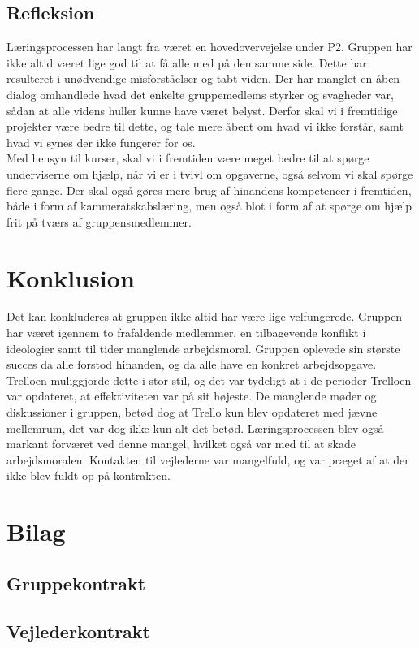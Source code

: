 \documentclass[11pt]{article}
\begin{document}
\subsection{Refleksion}
Læringsprocessen har langt fra været en hovedovervejelse under P2. Gruppen har ikke altid været lige god til at få alle med på den samme side. Dette har resulteret i unødvendige misforståelser og tabt viden. Der har manglet en åben dialog omhandlede hvad det enkelte gruppemedlems styrker og svagheder var, sådan at alle videns huller kunne have været belyst. Derfor skal vi i fremtidige projekter være bedre til dette, og tale mere åbent om hvad vi ikke forstår, samt hvad vi synes der ikke fungerer for os.\\
Med hensyn til kurser, skal vi i fremtiden være meget bedre til at spørge underviserne om hjælp, når vi er i tvivl om opgaverne, også selvom vi skal spørge flere gange. Der skal også gøres mere brug af hinandens kompetencer i fremtiden, både i form af kammeratskabslæring, men også blot i form af at spørge om hjælp frit på tværs af gruppensmedlemmer.

\section{Konklusion}
Det kan konkluderes at gruppen ikke altid har være lige velfungerede. Gruppen har været igennem to frafaldende medlemmer, en tilbagevende konflikt i ideologier samt til tider manglende arbejdsmoral. Gruppen oplevede sin største succes da alle forstod hinanden, og da alle have en konkret arbejdsopgave. Trelloen muliggjorde dette i stor stil, og det var tydeligt at i de perioder Trelloen var opdateret, at effektiviteten var på sit højeste. De manglende møder og diskussioner i gruppen, betød dog at Trello kun blev opdateret med jævne mellemrum, det var dog ikke kun alt det betød. Læringsprocessen blev også markant forværet ved denne mangel, hvilket også var med til at skade arbejdsmoralen. Kontakten til vejlederne var mangelfuld, og var præget af at der ikke blev fuldt op på kontrakten.

\newpage
\section{Bilag}
\subsection{Gruppekontrakt}
\label{gruppekontrakt}
\begin{mdframed}[linewidth=0pt,backgroundcolor=lightgray!20,innertopmargin = 0.4cm,innerbottommargin = 0.4cm]
    
\end{mdframed}

\subsection{Vejlederkontrakt}
\label{vejlederkontrakt}
\begin{mdframed}[linewidth=0pt,backgroundcolor=lightgray!20,innertopmargin = 0.4cm,innerbottommargin = 0.4cm]
    
\end{mdframed}
\end{document}
